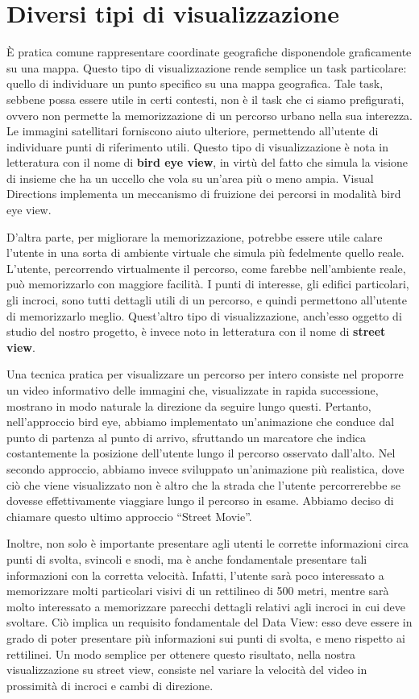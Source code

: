 \documentclass[12pt,a4paper,openright, notitlepage]{report}
\begin{document}
\section{Diversi tipi di visualizzazione}

È pratica comune rappresentare coordinate geografiche disponendole graficamente su una mappa. Questo tipo di visualizzazione rende semplice un task particolare: quello di individuare un punto specifico su una mappa geografica. Tale task, sebbene possa essere utile in certi contesti, non è il task che ci siamo prefigurati, ovvero non permette la memorizzazione di un percorso urbano nella sua interezza. Le immagini satellitari forniscono aiuto ulteriore, permettendo all'utente di individuare punti di riferimento utili. Questo tipo di visualizzazione è nota in letteratura con il nome di \textbf{bird eye view}, in virtù del fatto che simula la visione di insieme che ha un uccello che vola su un’area più o meno ampia. Visual Directions implementa un meccanismo di fruizione dei percorsi in modalità bird eye view.

D'altra parte, per migliorare la memorizzazione, potrebbe essere utile calare l'utente in una sorta di ambiente virtuale che simula più fedelmente quello reale. L'utente, percorrendo virtualmente il percorso, come farebbe nell'ambiente reale, può memorizzarlo con maggiore facilità. I punti di interesse, gli edifici particolari, gli incroci, sono tutti dettagli utili di un percorso, e quindi permettono all’utente di memorizzarlo meglio. Quest’altro tipo di visualizzazione, anch’esso oggetto di studio del nostro progetto, è invece noto in letteratura con il nome di \textbf{street view}.

Una tecnica pratica per visualizzare un percorso per intero consiste nel proporre un video informativo delle immagini che, visualizzate in rapida successione, mostrano in modo naturale la direzione da seguire lungo questi. Pertanto, nell’approccio bird eye, abbiamo implementato un’animazione che conduce dal punto di partenza al punto di arrivo, sfruttando un marcatore che indica costantemente la posizione dell’utente lungo il percorso osservato dall’alto. Nel secondo approccio, abbiamo invece sviluppato un’animazione più realistica, dove ciò che viene visualizzato non è altro che la strada che l’utente percorrerebbe se dovesse effettivamente viaggiare lungo il percorso in esame. Abbiamo deciso di chiamare questo ultimo approccio ``Street Movie''. 

Inoltre, non solo è importante presentare agli utenti le corrette informazioni circa punti di svolta, svincoli e snodi, ma è anche fondamentale presentare tali informazioni con la corretta velocità. Infatti, l’utente sarà poco interessato a memorizzare molti particolari visivi di un rettilineo di 500 metri, mentre sarà molto interessato a memorizzare parecchi dettagli relativi agli incroci in cui deve svoltare. Ciò implica un requisito fondamentale del Data View: esso deve essere in grado di poter presentare più informazioni sui punti di svolta, e meno rispetto ai rettilinei. Un modo semplice per ottenere questo risultato, nella nostra visualizzazione su street view, consiste nel variare la velocità del video in prossimità di incroci e cambi di direzione.
\end{document}
